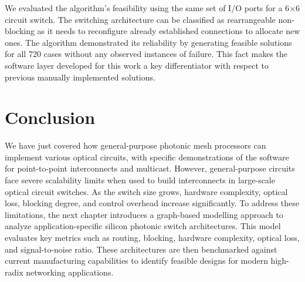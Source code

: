 
We evaluated the algorithm's feasibility using the same set of I/O ports for a 6$\times$6 circuit switch.
The switching architecture can be classified as rearrangeable non-blocking as it needs to reconfigure already established connections to allocate new ones.
The algorithm demonstrated its reliability by generating feasible solutions for all 720 cases without any observed instances of failure.
This fact makes the software layer developed for this work a key differentiator with respect to previous manually implemented solutions.
\section{Conclusion}\label{sec:ch3_conclusion}
We have just covered how general-purpose photonic mesh processors can implement various optical circuits, with specific demonstrations of the software for point-to-point interconnects and multicast.
However, general-purpose circuits face severe scalability limits when used to build interconnects in large-scale optical circuit switches.
As the switch size grows, hardware complexity, optical loss, blocking degree, and control overhead increase significantly.
To address these limitations, the next chapter introduces a graph-based modelling approach to analyze application-specific silicon photonic switch architectures.
This model evaluates key metrics such as routing, blocking, hardware complexity, optical loss, and signal-to-noise ratio.
These architectures are then benchmarked against current manufacturing capabilities to identify feasible designs for modern high-radix networking applications.
